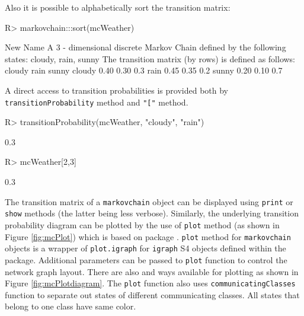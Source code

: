 \documentclass[
  nojss]{jss}
\begin{document}
Also it is possible to alphabetically sort the transition matrix:

\begin{CodeChunk}

\begin{CodeInput}
R> markovchain:::sort(mcWeather)
\end{CodeInput}

\begin{CodeOutput}
New Name 
 A  3 - dimensional discrete Markov Chain defined by the following states: 
 cloudy, rain, sunny 
 The transition matrix  (by rows)  is defined as follows: 
       cloudy rain sunny
cloudy   0.40 0.30   0.3
rain     0.45 0.35   0.2
sunny    0.20 0.10   0.7
\end{CodeOutput}
\end{CodeChunk}

A direct access to transition probabilities is provided both by \texttt{transitionProbability} method and \texttt{"{[}"} method.

\begin{CodeChunk}

\begin{CodeInput}
R> transitionProbability(mcWeather, "cloudy", "rain")
\end{CodeInput}

\begin{CodeOutput}
[1] 0.3
\end{CodeOutput}

\begin{CodeInput}
R> mcWeather[2,3]
\end{CodeInput}

\begin{CodeOutput}
[1] 0.3
\end{CodeOutput}
\end{CodeChunk}

The transition matrix of a \texttt{markovchain} object can be displayed using \texttt{print} or \texttt{show} methods (the latter being less verbose). Similarly, the underlying transition probability diagram can be plotted by the use of \texttt{plot} method (as shown in Figure \ref{fig:mcPlot}) which is based on  package \citep{pkg:igraph}. \texttt{plot} method for \texttt{markovchain} objects is a wrapper of \texttt{plot.igraph} for \texttt{igraph} S4 objects defined within the  package. Additional parameters can be passed to \texttt{plot} function to control the network graph layout. There are also  and  ways available for plotting as shown in Figure \ref{fig:mcPlotdiagram}. The \texttt{plot} function also uses \texttt{communicatingClasses} function to separate out states of different communicating classes. All states that belong to one class have same color.
\end{document}
